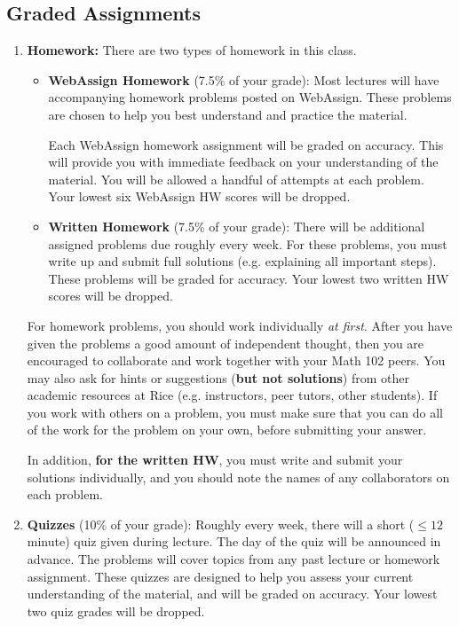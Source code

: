\documentclass[11pt]{article}
\begin{document}
\subsection{Graded Assignments}
\begin{enumerate}
\item \textbf{Homework:}  There are two types of homework in this class.

\begin{itemize}
    \item \textbf{WebAssign Homework} (7.5\% of your grade): Most lectures will have accompanying homework problems posted on WebAssign.  These problems are chosen to help you best understand and practice the material.  

Each WebAssign homework assignment will be graded on accuracy.  This will provide you with immediate feedback on your understanding of the material.  You will be allowed a handful of attempts at each problem.  Your lowest six WebAssign HW scores will be dropped.

\item \textbf{Written Homework} (7.5\% of your grade): There will be additional assigned problems due roughly every week.  For these problems, you must write up and submit full solutions (e.g. explaining all important steps).  These problems will be graded for accuracy. Your lowest two written HW scores will be dropped.
\end{itemize}

For homework problems, you should work individually \textit{at first}. After you have given the problems a good amount of independent thought, then you are encouraged to collaborate and work together with your Math 102 peers.   You may also ask for hints or suggestions (\textbf{but not solutions}) from other academic resources at Rice (e.g. instructors, peer tutors, other students).  If you work with others on a problem, you must make sure that you can do all of the work for the problem on your own, before submitting your answer.

In addition, \textbf{for the written HW}, you must write and submit your solutions individually, and you should note the names of any collaborators on each problem.


\item \textbf{Quizzes} (10\% of your grade): Roughly every week, there will a short ($\leq 12$ minute) quiz given during lecture.  The day of the quiz will be announced in advance.  The problems will cover topics from any past lecture or homework assignment. These quizzes are designed to help you assess your current understanding of the material, and will be graded on accuracy.  Your lowest two quiz grades will be dropped.


\end{enumerate}
\end{document}
